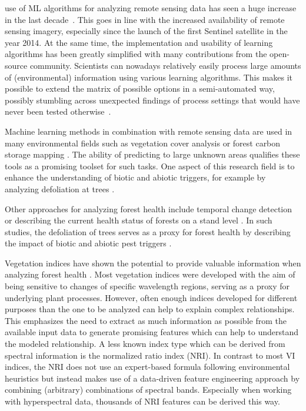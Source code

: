 \documentclass[letterpaper, peerreview]{IEEEtran}
\begin{document}
 use of \ac{ML} algorithms for analyzing remote sensing data has seen a huge increase in the last decade~\cite{lary2016}.
This goes in line with the increased availability of remote sensing imagery, especially since the launch of the first Sentinel satellite in the year 2014.
At the same time, the implementation and usability of learning algorithms has been greatly simplified with many contributions from the open-source community.
Scientists can nowadays relatively easily process large amounts of (environmental) information using various learning algorithms.
This makes it possible to extend the matrix of possible options in a semi-automated way, possibly stumbling across unexpected findings of process settings that would have never been tested otherwise~\cite{ma2015}.


Machine learning methods in combination with remote sensing data are used in many environmental fields such as vegetation cover analysis or forest carbon storage mapping \cite{mascaro2014, urban2018}.
The ability of predicting to large unknown areas qualifies these tools as a promising toolset for such tasks.
One aspect of this research field is to enhance the understanding of biotic and abiotic triggers, for example by analyzing defoliation at trees \cite{hawrylo2018}.

Other approaches for analyzing forest health include temporal change detection \cite{zhang2016} or describing the current health status of forests on a stand level \cite{townsend2012}.
In such studies, the defoliation of trees serves as a proxy for forest health by describing the impact of biotic and abiotic pest triggers \cite{townsend2012, goodbody2018}.

Vegetation indices have shown the potential to provide valuable information when analyzing forest health \cite{jiang2014, adamczyk2015}.
Most vegetation indices were developed with the aim of being sensitive to changes of specific wavelength regions, serving as a proxy for underlying plant processes. 
However, often enough indices developed for different purposes than the one to be analyzed can help to explain complex relationships.
This emphasizes the need to extract as much information as possible from the available input data to generate promising features which can help to understand the modeled relationship.
A less known index type which can be derived from spectral information is the normalized ratio index (NRI).
In contrast to most \ac{VI} indices, the \ac{NRI} does not use an expert-based formula following environmental heuristics but instead makes use of a data-driven feature engineering approach by combining (arbitrary) combinations of spectral bands.
Especially when working with hyperspectral data, thousands of \ac{NRI} features can be derived this way.
\end{document}
